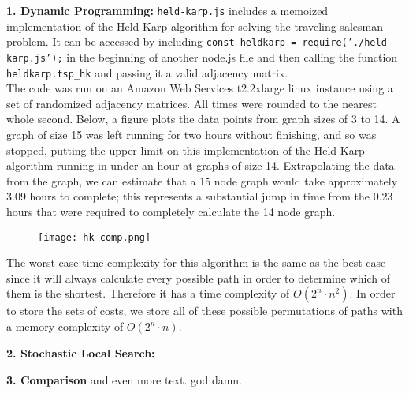 


\textbf{1. Dynamic Programming:} \texttt{held-karp.js} includes a memoized implementation of the Held-Karp algorithm for solving the traveling salesman problem. It can be accessed by including \texttt{const heldkarp = require('./held-karp.js');} in the beginning of another node.js file and then calling the function \texttt{heldkarp.tsp\_hk} and passing it a valid adjacency matrix. \\

The code was run on an Amazon Web Services t2.2xlarge linux instance using a set of randomized adjacency matrices. All times were rounded to the nearest whole second. Below, a figure plots the data points from graph sizes of 3 to 14. A graph of size 15 was left running for two hours without finishing, and so was stopped, putting the upper limit on this implementation of the Held-Karp algorithm running in under an hour at graphs of size 14. Extrapolating the data from the graph, we can estimate that a 15 node graph would take approximately 3.09 hours to complete; this represents a substantial jump in time from the 0.23 hours that were required to completely calculate the 14 node graph.
\begin{figure}[h]
    \texttt{[image: hk-comp.png]}
\end{figure}

The worst case time complexity for this algorithm is the same as the best case since it will always calculate every possible path in order to determine which of them is the shortest. Therefore it has a time complexity of $O(2^n\cdot n^2)$. In order to store the sets of costs, we store all of these possible permutations of paths with a memory complexity of $O(2^n\cdot n)$.

\noindent\textbf{2. Stochastic Local Search:} 

\noindent\textbf{3. Comparison} and even more text. god damn.


